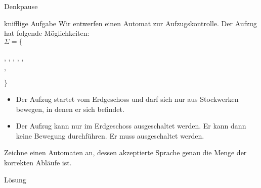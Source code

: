 {
\begin{frame}{Denkpause}
\begin{small}
    \begin{alertblock}{knifflige Aufgabe}
    Wir entwerfen einen Automat zur Aufzugskontrolle.
    Der Aufzug hat folgende Möglichkeiten:\\
    $\Sigma =\{$\begin{footnotesize}
     ,  ,  ,  ,  , \\\qquad\quad\; , 
    \end{footnotesize}$\}$
    \begin{itemize}
        \item Der Aufzug startet vom Erdgeschoss und darf sich nur aus Stockwerken bewegen, in denen er sich befindet.
        \item Der Aufzug kann nur im Erdgeschoss ausgeschaltet werden. Er kann dann keine Bewegung durchführen. Er muss ausgeschaltet werden.
    \end{itemize}
    \end{alertblock}
    \alert{Zeichne einen Automaten an, dessen akzeptierte Sprache genau die Menge der korrekten Abläufe ist.}
    \end{small}
\end{frame}

\begin{frame}{Lösung}
\begin{center}
\end{center}
\end{frame}
}


